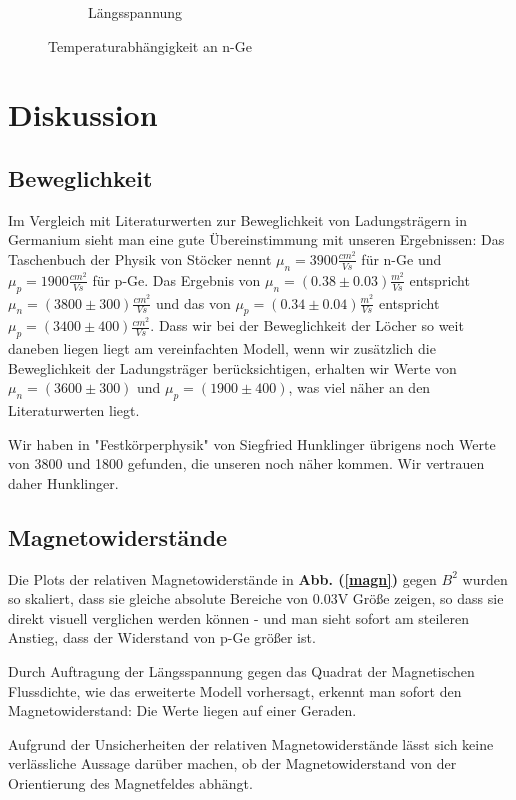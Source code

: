 \documentclass[12pt,a4paper,twopage]{article}
\begin{document}
\begin{figure}
\begin{subfigure}{0.4\textwidth}
\caption{\label{langssp}Längsspannung}
\end{subfigure}
\caption{Temperaturabhängigkeit an n-Ge}
\end{figure}



 
\section{Diskussion}		
\subsection*{Beweglichkeit}
Im Vergleich mit Literaturwerten zur Beweglichkeit von Ladungsträgern in Germanium sieht man eine gute Übereinstimmung mit unseren Ergebnissen: Das Taschenbuch der Physik von Stöcker nennt $\mu_n = 3900 \frac{cm^2}{Vs}$ für n-Ge und $\mu_p = 1900 \frac{cm^2}{Vs}$ für p-Ge. Das Ergebnis von $\mu_n = (0.38 \pm 0.03) \frac{m^2}{Vs}$ entspricht $\mu_n = (3800 \pm 300) \frac{cm^2}{Vs}$ und das von $\mu_p = (0.34 \pm 0.04) \frac{m^2}{Vs}$ entspricht $\mu_p = (3400 \pm 400) \frac{cm^2}{Vs}$. Dass wir bei der Beweglichkeit der Löcher so weit daneben liegen liegt am vereinfachten Modell, wenn wir zusätzlich die Beweglichkeit der Ladungsträger berücksichtigen, erhalten wir Werte von $\mu_n = (3600 \pm 300)$  und $\mu_p =(1900 \pm 400)$, was viel näher an den Literaturwerten liegt. 

Wir haben in "Festkörperphysik" von Siegfried Hunklinger übrigens noch Werte von 3800 und 1800 gefunden, die unseren noch näher kommen. Wir vertrauen daher Hunklinger.
\subsection*{Magnetowiderstände}								
Die Plots der relativen Magnetowiderstände in \textbf{Abb. (\ref{magn}) } gegen $B^2$ wurden so skaliert, dass sie gleiche absolute Bereiche von 0.03V	Größe zeigen, so dass sie direkt visuell verglichen werden können - und man sieht sofort am steileren Anstieg, dass der Widerstand von p-Ge größer ist.

Durch Auftragung der Längsspannung gegen das Quadrat der Magnetischen Flussdichte, wie das erweiterte Modell vorhersagt, erkennt man sofort den Magnetowiderstand: Die Werte liegen auf einer Geraden.

Aufgrund der Unsicherheiten der relativen Magnetowiderstände lässt sich keine verlässliche Aussage darüber machen, ob der Magnetowiderstand von der Orientierung des Magnetfeldes abhängt.
\end{document}
